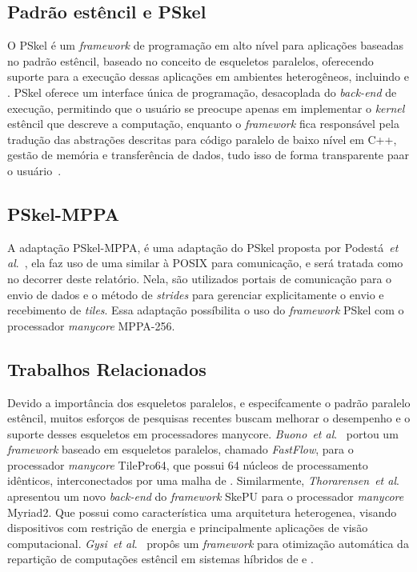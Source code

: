 \documentclass[a4paper,11pt]{article}
\newcommand{\etal}{\textit{et al}.\xspace}
\newcommand{\pskel}{PSkel\xspace}
\newcommand{\mppa}{MPPA-256\xspace}
\newcommand{\fw}{\textit{framework}\xspace}
\begin{document}
\subsection{Padrão estêncil e PSkel}
\label{subsec:pskel}

O \pskel é um \fw de programação em alto nível para aplicações baseadas no
padrão estêncil, baseado no conceito de esqueletos paralelos, oferecendo suporte para a execução dessas aplicações em
ambientes heterogêneos, incluindo \cpu e \gpu. \pskel oferece um interface única de programação, desacoplada do \emph{back-end} de execução, permitindo que o usuário se preocupe apenas em implementar o \emph{kernel} estêncil que descreve a computação, enquanto o \fw fica responsável pela tradução das abstrações descritas para código paralelo de baixo nível em C++, gestão de memória e transferência de dados, tudo isso de forma transparente paar o usuário~\cite{pereira15}.


\subsection{PSkel-MPPA}
\label{subsec:pskel-mppa}

A adaptação PSkel-MPPA, é uma adaptação do \pskel proposta por Podestá~\etal~\cite{PodestaJr.2017}, ela faz uso de uma \api similar à POSIX \ipc para comunicação, e será tratada como \ipc no decorrer deste relatório. Nela, são utilizados portais de comunicação para o envio de dados e o método de \textit{strides}  para gerenciar explicitamente o envio e recebimento de \textit{tiles}. Essa adaptação possíbilita o uso do \fw PSkel com o processador \emph{manycore} \mppa.

\subsection{Trabalhos Relacionados}

Devido a importância dos esqueletos paralelos, e especifcamente o padrão paralelo estêncil, muitos esforços de pesquisas recentes buscam melhorar o desempenho e o suporte desses esqueletos em processadores manycore. \emph{Buono}~\etal~\cite{buono13} portou um \fw baseado em esqueletos paralelos, chamado \emph{FastFlow}, para o processador \emph{manycore} TilePro64, que possui 64 núcleos de processamento idênticos, interconectados por uma malha de \noc. Similarmente, \emph{Thorarensen}~\etal~\cite{thoraransen16} apresentou um novo \emph{back-end} do \fw SkePU para o processador \emph{manycore} Myriad2. Que possui como característica uma arquitetura heterogenea, visando dispositivos com restrição de energia e principalmente aplicações de visão computacional. \emph{Gysi}~\etal~\cite{gysi15} propôs um \fw para otimização automática da repartição de computações estêncil em sistemas híbridos de \cpu e \gpu.
\end{document}
